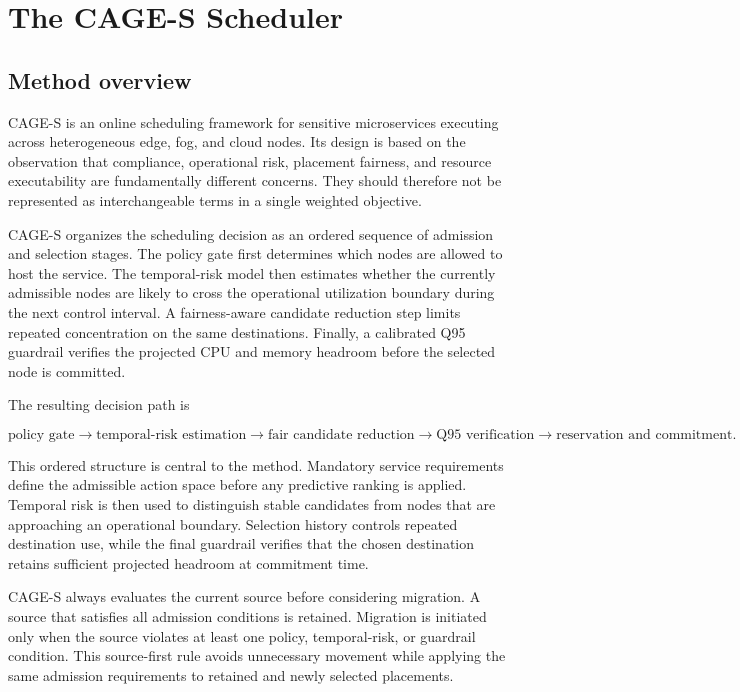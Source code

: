 \section{The CAGE-S Scheduler}
\label{sec:method}

\subsection{Method overview}

CAGE-S is an online scheduling framework for sensitive microservices
executing across heterogeneous edge, fog, and cloud nodes. Its design is
based on the observation that compliance, operational risk, placement
fairness, and resource executability are fundamentally different concerns.
They should therefore not be represented as interchangeable terms in a
single weighted objective.

CAGE-S organizes the scheduling decision as an ordered sequence of
admission and selection stages. The policy gate first determines which
nodes are allowed to host the service. The temporal-risk model then
estimates whether the currently admissible nodes are likely to cross the
operational utilization boundary during the next control interval. A
fairness-aware candidate reduction step limits repeated concentration on
the same destinations. Finally, a calibrated Q95 guardrail verifies the
projected CPU and memory headroom before the selected node is committed.

The resulting decision path is

\begin{equation}
\label{eq:cage-decision-path}
\text{policy gate}
\rightarrow
\text{temporal-risk estimation}
\rightarrow
\text{fair candidate reduction}
\rightarrow
\text{Q95 verification}
\rightarrow
\text{reservation and commitment}.
\end{equation}

This ordered structure is central to the method. Mandatory service
requirements define the admissible action space before any predictive
ranking is applied. Temporal risk is then used to distinguish stable
candidates from nodes that are approaching an operational boundary.
Selection history controls repeated destination use, while the final
guardrail verifies that the chosen destination retains sufficient
projected headroom at commitment time.

CAGE-S always evaluates the current source before considering migration.
A source that satisfies all admission conditions is retained. Migration
is initiated only when the source violates at least one policy,
temporal-risk, or guardrail condition. This source-first rule avoids
unnecessary movement while applying the same admission requirements to
retained and newly selected placements.

